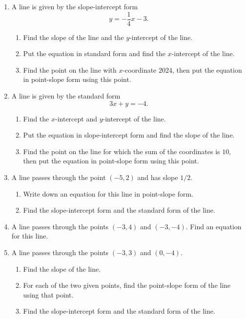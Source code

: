\documentclass{article}
\begin{document}
\begin{enumerate}
\begin{center}
\end{center}
\item A line is given by the slope-intercept form
\begin{equation*}
y = -\frac{1}{4}x - 3.
\end{equation*}
\begin{enumerate}
\item Find the slope of the line and the $y$-intercept of the line.
\item Put the equation in standard form and find the $x$-intercept of the line.
\item Find the point on the line with $x$-coordinate $2024$, then put the equation in point-slope form using this point.
\end{enumerate}
\item A line is given by the standard form
\begin{equation*}
3x + y = -4.
\end{equation*}
\begin{enumerate}
\item Find the $x$-intercept and $y$-intercept of the line.
\item Put the equation in slope-intercept form and find the slope of the line.
\item Find the point on the line for which the sum of the coordinates is $10$, then put the equation in point-slope form using this point.
\end{enumerate}
\item A line passes through the point $(-5,2)$ and has slope $1/2$.
\begin{enumerate}
\item Write down an equation for this line in point-slope form.
\item Find the slope-intercept form and the standard form of the line.
\end{enumerate}
\item A line passes through the points $(-3,4)$ and $(-3,-4)$. Find an equation for this line.
\item A line passes through the points $(-3,3)$ and $(0,-4)$.
\begin{enumerate}
\item Find the slope of the line.
\item For each of the two given points, find the point-slope form of the line using that point.
\item Find the slope-intercept form and the standard form of the line.
\end{enumerate}

\end{enumerate}
\end{document}
